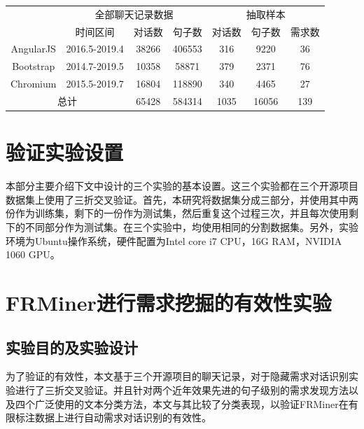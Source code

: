 \begin{table}[htbp]
    \label{tab:dataset}
    \centering
    \footnotesize%
    \setlength{\tabcolsep}{4pt}%
    \renewcommand{\arraystretch}{1.2}%
\begin{tabular}{|c|c|c|c|c|c|c|}
\hline
\multirow{}{}{} & \multicolumn{3}{c|}{全部聊天记录数据}    & \multicolumn{3}{c|}{抽取样本} \\ \cline{2-7} 
                  & 时间区间          & 对话数   & 句子数    & 对话数    & 句子数     & 需求数  \\ \hline
AngularJS         & 2016.5-2019.4 & 38266 & 406553 & 316    & 9220    & 36     \\ \hline
Bootstrap         & 2014.7-2019.5 & 10358 & 58871  & 379    & 2371    & 76     \\ \hline
Chromium          & 2015.5-2019.7 & 16804 & 118890 & 340    & 4465    & 27     \\ \hline
\multicolumn{2}{|c|}{总计}          & 65428 & 584314 & 1035   & 16056   & 139    \\ \hline
\end{tabular}
\end{table}

\section{验证实验设置}
本部分主要介绍下文中设计的三个实验的基本设置。这三个实验都在三个开源项目数据集上使用了三折交叉验证\cite{DBLP:conf/ijcai/Kohavi95}。首先，本研究将数据集分成三部分，并使用其中两份作为训练集，剩下的一份作为测试集，然后重复这个过程三次，并且每次使用剩下的不同部分作为测试集。在三个实验中，均使用相同的分割数据集。另外，实验环境为Ubuntu操作系统，硬件配置为Intel core i7 CPU，16G RAM，NVIDIA 1060 GPU。


\section{FRMiner进行需求挖掘的有效性实验}
\subsection{实验目的及实验设计}
为了验证{\tool}的有效性，本文基于三个开源项目的聊天记录，对于隐藏需求对话识别实验进行了三折交叉验证。并且针对两个近年效果先进的句子级别的需求发现方法以及四个广泛使用的文本分类方法，本文与其比较了分类表现，以验证FRMiner在有限标注数据上进行自动需求对话识别的有效性。

